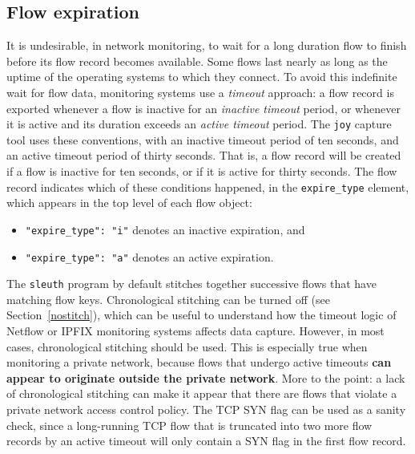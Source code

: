 \documentclass{book}
\begin{document}
\subsection{Flow expiration}
\label{expiration}
It is undesirable, in network monitoring, to wait for a long duration
flow to finish before its flow record becomes available.  Some flows
last nearly as long as the uptime of the operating systems to which
they connect.  To avoid this indefinite wait for flow data, monitoring
systems use a \textit{timeout} approach: a flow record is exported
whenever a flow is inactive for an \textit{inactive timeout} period,
or whenever it is active and its duration exceeds an \textit{active
  timeout} period.  The \texttt{joy} capture tool uses these
conventions, with an inactive timeout period of ten seconds, and an
active timeout period of thirty seconds.  That is, a flow record will
be created if a flow is inactive for ten seconds, or if it is active
for thirty seconds.  The flow record indicates which of these
conditions happened, in the \texttt{expire\_type} element, which
appears in the top level of each flow object:
\begin{itemize}
  \item \texttt{"expire\_type": "i"} denotes an inactive expiration, and
  \item \texttt{"expire\_type": "a"} denotes an active expiration.
\end{itemize}
The \texttt{sleuth} program by default stitches together successive
flows that have matching flow keys.  Chronological stitching can be
turned off (see Section~\ref{nostitch}), which can be useful to
understand how the timeout logic of Netflow or IPFIX monitoring
systems affects data capture.  However, in most cases, chronological
stitching should be used.  This is especially true when monitoring a
private network, because flows that undergo active timeouts
\textbf{can appear to originate outside the private network}.  More to
the point: a lack of chronological stitching can make it appear that
there are flows that violate a private network access control policy.
The TCP SYN flag can be used as a sanity check, since a long-running
TCP flow that is truncated into two more flow records by an active
timeout will only contain a SYN flag in the first flow record.
\end{document}
